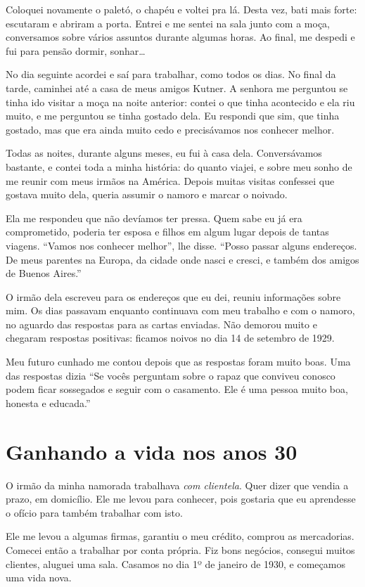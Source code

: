 Coloquei novamente o paletó, o chapéu e voltei pra lá. Desta vez, bati mais
forte: escutaram e abriram a porta. Entrei e me sentei na sala junto com a moça, 
conversamos sobre vários assuntos durante algumas horas. Ao final, me
despedi e fui para pensão dormir, sonhar\ldots

No dia seguinte acordei e saí para trabalhar, como todos os dias. No final da tarde,
caminhei até a casa de meus amigos Kutner. A senhora me perguntou se
tinha ido visitar a moça na noite anterior: contei o que tinha
acontecido e ela riu muito, e me perguntou se tinha gostado dela. Eu respondi 
que sim, que tinha gostado, mas que era ainda muito
cedo e precisávamos nos conhecer melhor.

Todas as noites, durante alguns meses, eu fui à casa dela.
Conversávamos bastante, e contei toda a minha história: do quanto viajei, e
sobre meu sonho de me reunir com meus irmãos na América. Depois muitas visitas 
confessei que gostava muito dela, queria assumir o namoro e
marcar o noivado.

Ela me respondeu que não devíamos ter pressa. Quem sabe eu já era
comprometido, poderia ter esposa e filhos em algum lugar depois de tantas viagens. 
``Vamos nos conhecer melhor'', lhe disse. ``Posso passar alguns endereços. De meus parentes na Europa, da
cidade onde nasci e cresci, e também dos amigos de Buenos Aires.''

O irmão dela escreveu para os endereços que eu dei, reuniu informações
sobre mim. Os dias passavam enquanto continuava com meu
trabalho e com o namoro, no aguardo das respostas para as cartas enviadas. Não
demorou muito e chegaram respostas positivas: ficamos noivos no dia 14 de
setembro de 1929.

Meu futuro cunhado me contou depois que as respostas foram muito
boas. Uma das respostas dizia ``Se vocês perguntam sobre o rapaz que conviveu
conosco podem ficar sossegados e seguir com o casamento. Ele é uma pessoa
muito boa, honesta e educada.''

\chapter{Ganhando a vida nos anos 30}

O irmão da minha namorada trabalhava \textit{com clientela}. Quer dizer que vendia a
prazo, em domicílio. Ele me levou para conhecer, pois gostaria que eu aprendesse o ofício
para também trabalhar com isto.

Ele me levou a algumas firmas, garantiu o meu crédito, comprou as
mercadorias. Comecei então a trabalhar por conta própria. Fiz bons
negócios, consegui muitos clientes, aluguei uma sala. Casamos no dia 1º
de janeiro de 1930, e começamos uma vida nova.

